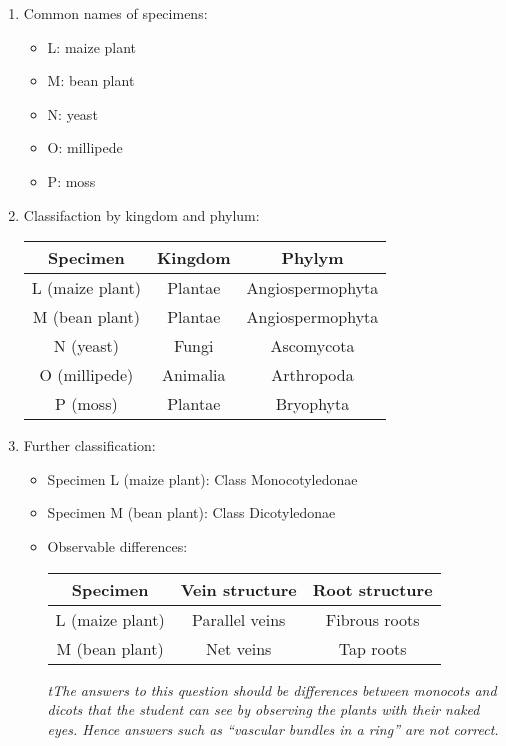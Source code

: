 \begin{enumerate}

\item{Common names of specimens:}
\begin{itemize}
\item{L: maize plant}
\item{M: bean plant}
\item{N: yeast}
\item{O: millipede}
\item{P: moss}
\end{itemize}


\item{Classifaction by kingdom and phylum:}

\begin{center}
\begin{tabular}{ | c | c | c |}
\hline
Specimen & Kingdom & Phylym \\ \hline
L (maize plant) & Plantae & Angiospermophyta \\ \hline
M (bean plant) & Plantae & Angiospermophyta \\ \hline
N (yeast) & Fungi & Ascomycota \\ \hline
O (millipede) & Animalia & Arthropoda \\ \hline
P (moss) & Plantae & Bryophyta \\ \hline
\hline
\end{tabular}
\end{center}

\item{Further classification:}
\begin{itemize}
\item{Specimen L (maize plant): Class Monocotyledonae}
\item{Specimen M (bean plant): Class Dicotyledonae}
\item{Observable differences:}

\begin{center}
\begin{tabular}{ | c | c | c |}
\hline
Specimen & Vein structure & Root structure \\ \hline
L (maize plant) & Parallel veins & Fibrous roots \\ \hline
M (bean plant) & Net veins & Tap roots \\ \hline
\hline
\end{tabular}
\end{center}

\textit{tThe answers to this question should be differences between monocots and dicots that the student can see by observing the plants with their naked eyes. Hence answers such as ``vascular bundles in a ring'' are not correct.}


\end{itemize}
\end{enumerate}
